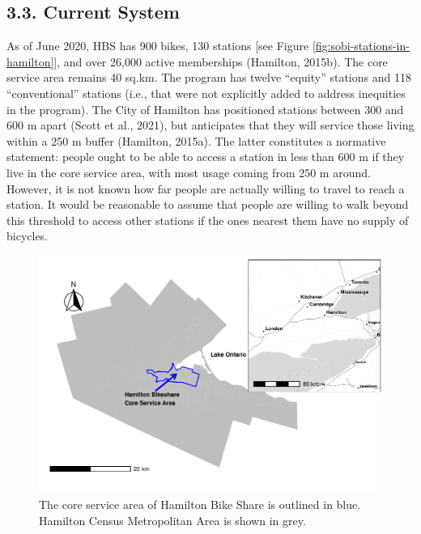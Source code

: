 \documentclass[]{elsarticle} %
\providecommand{\DIFaddbeginFL}{} %
\providecommand{\DIFaddendFL}{} %
\providecommand{\DIFdelbeginFL}{} %
\providecommand{\DIFdelendFL}{} %
\newcommand{\DIFscaledelfig}{0.5}
\newlength{\DIFdelgraphicswidth} %
\newlength{\DIFdelgraphicsheight} %
\newcommand{\DIFaddincludegraphics}[2][]{{\color{blue}\fbox{\DIFOincludegraphics[#1]{#2}}}} %
\newcommand{\DIFdelincludegraphics}[2][]{%
\sbox{\DIFdelgraphicsbox}{\DIFOincludegraphics[#1]{#2}}%
\settoboxwidth{\DIFdelgraphicswidth}{\DIFdelgraphicsbox} %
\settoboxtotalheight{\DIFdelgraphicsheight}{\DIFdelgraphicsbox} %
\scalebox{\DIFscaledelfig}{%
\parbox[b]{\DIFdelgraphicswidth}{\usebox{\DIFdelgraphicsbox}\\[-\baselineskip] \rule{\DIFdelgraphicswidth}{0em}}\llap{\resizebox{\DIFdelgraphicswidth}{\DIFdelgraphicsheight}{%
\setlength{\unitlength}{\DIFdelgraphicswidth}%
\begin{picture}(1,1)%
\thicklines\linethickness{2pt} %
{\color[rgb]{1,0,0}\put(0,0){\framebox(1,1){}}}%
{\color[rgb]{1,0,0}\put(0,0){\line( 1,1){1}}}%
{\color[rgb]{1,0,0}\put(0,1){\line(1,-1){1}}}%
\end{picture}%
}\hspace*{3pt}}} %
} %
\DeclareRobustCommand{\DIFaddbeginFL}{\DIFOaddbeginFL \let\includegraphics\DIFaddincludegraphics} %
\DeclareRobustCommand{\DIFaddendFL}{\DIFOaddendFL \let\includegraphics\DIFOincludegraphics} %
\DeclareRobustCommand{\DIFdelbeginFL}{\DIFOdelbeginFL \let\includegraphics\DIFdelincludegraphics} %
\DeclareRobustCommand{\DIFdelendFL}{\DIFOaddendFL \let\includegraphics\DIFOincludegraphics} %
\begin{document}
\hypertarget{current-system}{%
\subsection{3.3. Current System}\label{current-system}}

As of June 2020, HBS has 900 bikes, 130 stations {[}see Figure
\ref{fig:sobi-stations-in-hamilton}{]}, and over 26,000 active
memberships (Hamilton, 2015b). The core service area remains 40 sq.km.
The program has twelve ``equity'' stations and 118 ``conventional''
stations (i.e., that were not explicitly added to address inequities in
the program). The City of Hamilton has positioned stations between 300
and 600 m apart (Scott et al., 2021), but anticipates that they will
service those living within a 250 m buffer (Hamilton, 2015a). The latter
constitutes a normative statement: people ought to be able to access a
station in less than 600 m if they live in the core service area, with
most usage coming from 250 m around. However, it is not known how far
people are actually willing to travel to reach a station. It would be
reasonable to assume that people are willing to walk beyond this
threshold to access other stations if the ones nearest them have no
supply of bicycles.

\begin{figure}

{\centering \DIFdelbeginFL %
\DIFdelendFL \DIFaddbeginFL \includegraphics[width=0.9\linewidth]{Bike-share-spatial-equity_files/figure-latex/hamilton-and-sobi-service-area-1} 
\DIFaddendFL 

}

\caption{The core service area of Hamilton Bike Share is outlined in blue. Hamilton Census Metropolitan Area is shown in grey.}\label{fig:hamilton-and-sobi-service-area}
\end{figure}
\end{document}
